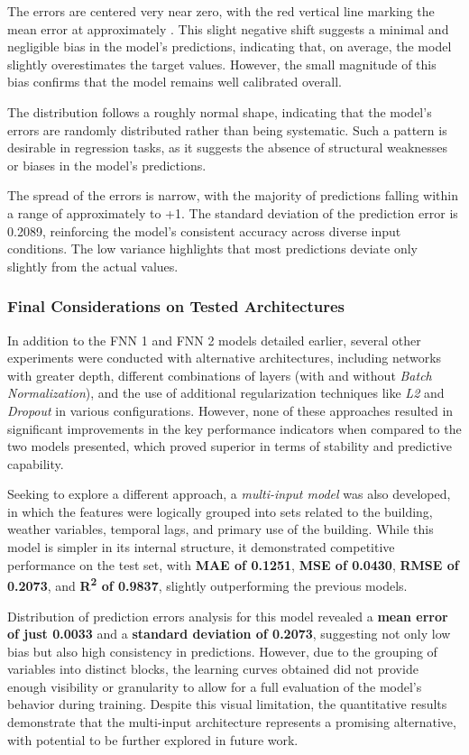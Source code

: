 The errors are centered very near zero, with the red vertical line marking the mean error at approximately . This slight negative shift suggests a minimal and negligible bias in the model's predictions, indicating that, on average, the model slightly overestimates the target values. However, the small magnitude of this bias confirms that the model remains well calibrated overall.

The distribution follows a roughly normal shape, indicating that the model's errors are randomly distributed rather than being systematic. Such a pattern is desirable in regression tasks, as it suggests the absence of structural weaknesses or biases in the model's predictions.

The spread of the errors is narrow, with the majority of predictions falling within a range of approximately  to +1. The standard deviation of the prediction error is 0.2089, reinforcing the model’s consistent accuracy across diverse input conditions. The low variance highlights that most predictions deviate only slightly from the actual values.

\subsubsection{Final Considerations on Tested Architectures}

In addition to the FNN 1 and FNN 2 models detailed earlier, several other experiments were conducted with alternative architectures, including networks with greater depth, different combinations of layers (with and without \textit{Batch Normalization}), and the use of additional regularization techniques like \textit{L2} and \textit{Dropout} in various configurations. However, none of these approaches resulted in significant improvements in the key performance indicators when compared to the two models presented, which proved superior in terms of stability and predictive capability.

Seeking to explore a different approach, a \textit{multi-input model} was also developed, in which the features were logically grouped into sets related to the building, weather variables, temporal lags, and primary use of the building. While this model is simpler in its internal structure, it demonstrated competitive performance on the test set, with \textbf{MAE of 0.1251}, \textbf{MSE of 0.0430}, \textbf{RMSE of 0.2073}, and \textbf{R\textsuperscript{2} of 0.9837}, slightly outperforming the previous models.

Distribution of prediction errors analysis for this model revealed a \textbf{mean error of just 0.0033} and a \textbf{standard deviation of 0.2073}, suggesting not only low bias but also high consistency in predictions. However, due to the grouping of variables into distinct blocks, the learning curves obtained did not provide enough visibility or granularity to allow for a full evaluation of the model’s behavior during training. Despite this visual limitation, the quantitative results demonstrate that the multi-input architecture represents a promising alternative, with potential to be further explored in future work.


